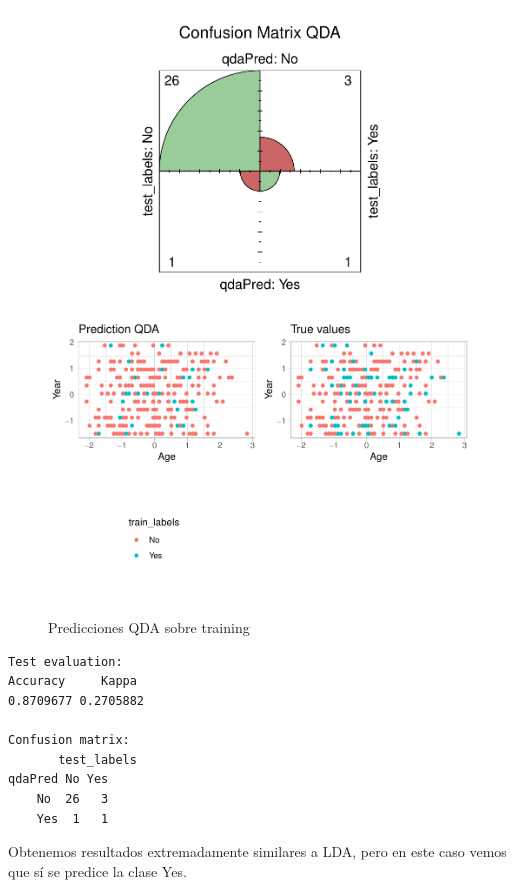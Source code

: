 \begin{figure}[H]\center\includegraphics[width=.9\linewidth]{img/Clasificacion_files/figure-latex/unnamed-chunk-31-1}\caption{}\end{figure}

\begin{figure}[H]\center\includegraphics[width=.9\linewidth]{img/Clasificacion_files/figure-latex/unnamed-chunk-32-1}\caption{Predicciones QDA sobre training}\end{figure}


\begin{verbatim}
Test evaluation:
Accuracy     Kappa 
0.8709677 0.2705882

Confusion matrix:
       test_labels
qdaPred No Yes
    No  26   3
    Yes  1   1
\end{verbatim}


Obtenemos resultados extremadamente similares a LDA, pero en este caso vemos que sí se predice la clase Yes.


